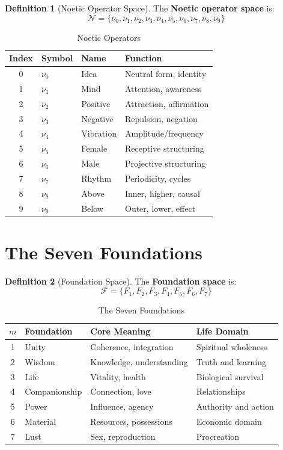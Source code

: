 \documentclass[11pt,twoside,openright]{book}
\theoremstyle{definition}
\newtheorem{definition}{Definition}[chapter]
\theoremstyle{plain}
\theoremstyle{remark}
\newcommand{\Noetics}{\mathcal{N}}
\newcommand{\Foundations}{\mathcal{F}}
\newcommand{\noe}[1]{\nu_{#1}}
\begin{document}
\begin{definition}[Noetic Operator Space]
\label{def:noetic-space}
The \textbf{Noetic operator space} is:
\[
\Noetics = \{\noe{0}, \noe{1}, \noe{2}, \noe{3}, \noe{4}, \noe{5}, \noe{6}, \noe{7}, \noe{8}, \noe{9}\}
\]
\end{definition}

\begin{table}[h]
\centering
\caption{Noetic Operators}
\label{tab:noetics}
\begin{tabular}{clll}
\toprule
\textbf{Index} & \textbf{Symbol} & \textbf{Name} & \textbf{Function} \\
\midrule
0 & $\noe{0}$ & Idea & Neutral form, identity \\
1 & $\noe{1}$ & Mind & Attention, awareness \\
2 & $\noe{2}$ & Positive & Attraction, affirmation \\
3 & $\noe{3}$ & Negative & Repulsion, negation \\
4 & $\noe{4}$ & Vibration & Amplitude/frequency \\
5 & $\noe{5}$ & Female & Receptive structuring \\
6 & $\noe{6}$ & Male & Projective structuring \\
7 & $\noe{7}$ & Rhythm & Periodicity, cycles \\
8 & $\noe{8}$ & Above & Inner, higher, causal \\
9 & $\noe{9}$ & Below & Outer, lower, effect \\
\bottomrule
\end{tabular}
\end{table}

\section{The Seven Foundations}

\begin{definition}[Foundation Space]
\label{def:foundation-space}
The \textbf{Foundation space} is:
\[
\Foundations = \{F_1, F_2, F_3, F_4, F_5, F_6, F_7\}
\]
\end{definition}

\begin{table}[h]
\centering
\caption{The Seven Foundations}
\label{tab:foundations}
\begin{tabular}{clll}
\toprule
$m$ & \textbf{Foundation} & \textbf{Core Meaning} & \textbf{Life Domain} \\
\midrule
1 & Unity & Coherence, integration & Spiritual wholeness \\
2 & Wisdom & Knowledge, understanding & Truth and learning \\
3 & Life & Vitality, health & Biological survival \\
4 & Companionship & Connection, love & Relationships \\
5 & Power & Influence, agency & Authority and action \\
6 & Material & Resources, possessions & Economic domain \\
7 & Lust & Sex, reproduction & Procreation \\
\bottomrule
\end{tabular}
\end{table}
\end{document}
